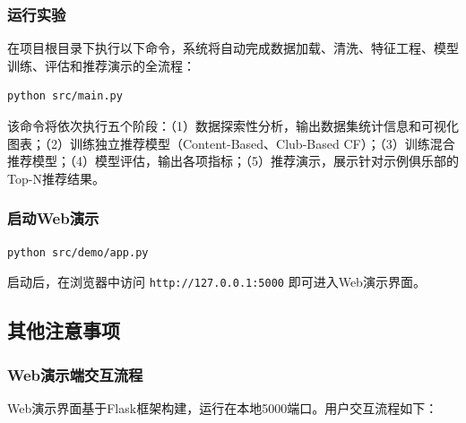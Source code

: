 \documentclass[a4paper]{article}
\begin{document}
\subsubsection{运行实验}

在项目根目录下执行以下命令，系统将自动完成数据加载、清洗、特征工程、模型训练、评估和推荐演示的全流程：

\begin{verbatim}
python src/main.py
\end{verbatim}

该命令将依次执行五个阶段：（1）数据探索性分析，输出数据集统计信息和可视化图表；（2）训练独立推荐模型（Content-Based、Club-Based CF）；（3）训练混合推荐模型；（4）模型评估，输出各项指标；（5）推荐演示，展示针对示例俱乐部的Top-N推荐结果。

\subsubsection{启动Web演示}

\begin{verbatim}
python src/demo/app.py
\end{verbatim}

启动后，在浏览器中访问 \texttt{http://127.0.0.1:5000} 即可进入Web演示界面。

\subsection{其他注意事项}

\subsubsection{Web演示端交互流程}

Web演示界面基于Flask框架构建，运行在本地5000端口。用户交互流程如下：
\end{document}
